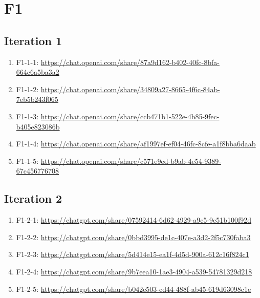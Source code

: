 \section{F1\label{F1}}

\subsection{Iteration 1\label{F1-1}}

\begin{enumerate}
    \item F1-1-1: \href{https://chat.openai.com/share/87a9d162-b402-40fc-8bfa-664c6a5ba3a2}{https://chat.openai.com/share/87a9d162-b402-40fc-8bfa-664c6a5ba3a2}
    \item F1-1-2: \href{https://chat.openai.com/share/34809a27-8665-4f6c-84ab-7eb5b243f065}{https://chat.openai.com/share/34809a27-8665-4f6c-84ab-7eb5b243f065}
    \item F1-1-3: \href{https://chat.openai.com/share/ccb471b1-522e-4b85-9fec-b405e823086b}{https://chat.openai.com/share/ccb471b1-522e-4b85-9fec-b405e823086b}
    \item F1-1-4: \href{https://chat.openai.com/share/af1997ef-ef04-46fc-8cfe-a1f8bba6daab}{https://chat.openai.com/share/af1997ef-ef04-46fc-8cfe-a1f8bba6daab}
    \item F1-1-5: \href{https://chat.openai.com/share/c571e9ed-b9ab-4e54-9389-67c456776708}{https://chat.openai.com/share/c571e9ed-b9ab-4e54-9389-67c456776708}
\end{enumerate}

\subsection{Iteration 2}

\begin{enumerate}
    \item F1-2-1: \href{https://chatgpt.com/share/07592414-6d62-4929-a9c5-9e51b100f92d}{https://chatgpt.com/share/07592414-6d62-4929-a9c5-9e51b100f92d}
    \item F1-2-2: \href{https://chatgpt.com/share/0bbd3995-de1c-407e-a3d2-2f5c730faba3}{https://chatgpt.com/share/0bbd3995-de1c-407e-a3d2-2f5c730faba3}
    \item F1-2-3: \href{https://chatgpt.com/share/5d414e15-ea1f-4d5d-900a-612c16f824c1}{https://chatgpt.com/share/5d414e15-ea1f-4d5d-900a-612c16f824c1}
    \item F1-2-4: \href{https://chatgpt.com/share/9b7eea10-1ae3-4904-a539-54781329d218}{https://chatgpt.com/share/9b7eea10-1ae3-4904-a539-54781329d218}
    \item F1-2-5: \href{https://chatgpt.com/share/b042e503-cd44-488f-ab45-619d63098c1e}{https://chatgpt.com/share/b042e503-cd44-488f-ab45-619d63098c1e}
\end{enumerate}

